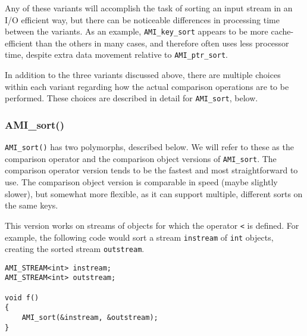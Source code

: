Any of these variants will accomplish the task of sorting an input
stream in an I/O efficient way, but there can be noticeable
differences in processing time between the variants. As an
example,
\lstinline|AMI_key_sort| appears to be more cache-efficient than the
others in many cases, and therefore often uses less processor time,
despite extra data movement relative to \lstinline|AMI_ptr_sort|.

In addition to the three variants discussed above, there are multiple
choices within each variant regarding how the actual comparison
operations are to be performed. These choices are described in detail
for \lstinline|AMI_sort|, below.


\subsubsection{AMI\_sort()}
\lstinline|AMI_sort()| has two polymorphs, described
below. We
will refer to these as the comparison operator and the comparison
object versions of \lstinline|AMI_sort|. The comparison operator
version tends to be the fastest and most straightforward to use. The
comparison object version is comparable in speed (maybe slightly
slower), but somewhat more flexible, as it can support multiple,
different sorts on the same keys.

\vspace*{\baselineskip}

 This version works on streams of
objects for which the operator \lstinline|<| is defined. For example,
the following code would sort a stream \lstinline|instream| of
\lstinline|int| objects, creating the sorted stream
\lstinline|outstream|.

\begin{lstlisting}
AMI_STREAM<int> instream;
AMI_STREAM<int> outstream;

void f()
{
    AMI_sort(&instream, &outstream);
}
\end{lstlisting}



